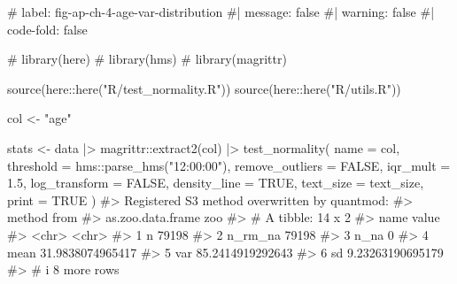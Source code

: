 \documentclass[
  12pt,
  a4paper,
  oneside]{tesesusp}
\newenvironment{Shaded}{\begin{snugshade}}{\end{snugshade}}
\newcommand{\AttributeTok}[1]{\textcolor[rgb]{0.40,0.45,0.13}{#1}}
\newcommand{\CommentTok}[1]{\textcolor[rgb]{0.37,0.37,0.37}{#1}}
\newcommand{\ConstantTok}[1]{\textcolor[rgb]{0.56,0.35,0.01}{#1}}
\newcommand{\FloatTok}[1]{\textcolor[rgb]{0.68,0.00,0.00}{#1}}
\newcommand{\FunctionTok}[1]{\textcolor[rgb]{0.28,0.35,0.67}{#1}}
\newcommand{\NormalTok}[1]{\textcolor[rgb]{0.00,0.23,0.31}{#1}}
\newcommand{\OtherTok}[1]{\textcolor[rgb]{0.00,0.23,0.31}{#1}}
\newcommand{\SpecialCharTok}[1]{\textcolor[rgb]{0.37,0.37,0.37}{#1}}
\newcommand{\StringTok}[1]{\textcolor[rgb]{0.13,0.47,0.30}{#1}}
\begin{document}
\begin{Shaded}
\begin{Highlighting}[numbers=left,,]
\CommentTok{\# label: fig{-}ap{-}ch{-}4{-}age{-}var{-}distribution}
\CommentTok{\#| message: false}
\CommentTok{\#| warning: false}
\CommentTok{\#| code{-}fold: false}

\CommentTok{\# library(here)}
\CommentTok{\# library(hms)}
\CommentTok{\# library(magrittr)}

\FunctionTok{source}\NormalTok{(here}\SpecialCharTok{::}\FunctionTok{here}\NormalTok{(}\StringTok{"R/test\_normality.R"}\NormalTok{))}
\FunctionTok{source}\NormalTok{(here}\SpecialCharTok{::}\FunctionTok{here}\NormalTok{(}\StringTok{"R/utils.R"}\NormalTok{))}

\NormalTok{col }\OtherTok{\textless{}{-}} \StringTok{"age"}

\NormalTok{stats }\OtherTok{\textless{}{-}}\NormalTok{ data }\SpecialCharTok{|\textgreater{}} 
\NormalTok{  magrittr}\SpecialCharTok{::}\FunctionTok{extract2}\NormalTok{(col) }\SpecialCharTok{|\textgreater{}} 
  \FunctionTok{test\_normality}\NormalTok{(}
    \AttributeTok{name =}\NormalTok{ col, }
    \AttributeTok{threshold =}\NormalTok{ hms}\SpecialCharTok{::}\FunctionTok{parse\_hms}\NormalTok{(}\StringTok{"12:00:00"}\NormalTok{), }
    \AttributeTok{remove\_outliers =} \ConstantTok{FALSE}\NormalTok{, }
    \AttributeTok{iqr\_mult =} \FloatTok{1.5}\NormalTok{, }
    \AttributeTok{log\_transform =} \ConstantTok{FALSE}\NormalTok{,}
    \AttributeTok{density\_line =} \ConstantTok{TRUE}\NormalTok{, }
    \AttributeTok{text\_size =}\NormalTok{ text\_size,}
    \AttributeTok{print =} \ConstantTok{TRUE}
\NormalTok{  )}
\CommentTok{\#\textgreater{} Registered S3 method overwritten by \textquotesingle{}quantmod\textquotesingle{}:}
\CommentTok{\#\textgreater{}   method            from}
\CommentTok{\#\textgreater{}   as.zoo.data.frame zoo}
\CommentTok{\#\textgreater{} \# A tibble: 14 x 2}
\CommentTok{\#\textgreater{}   name    value           }
\CommentTok{\#\textgreater{}   \textless{}chr\textgreater{}   \textless{}chr\textgreater{}           }
\CommentTok{\#\textgreater{} 1 n       79198           }
\CommentTok{\#\textgreater{} 2 n\_rm\_na 79198           }
\CommentTok{\#\textgreater{} 3 n\_na    0               }
\CommentTok{\#\textgreater{} 4 mean    31.9838074965417}
\CommentTok{\#\textgreater{} 5 var     85.2414919292643}
\CommentTok{\#\textgreater{} 6 sd      9.23263190695179}
\CommentTok{\#\textgreater{} \# i 8 more rows}
\end{Highlighting}
\end{Shaded}
\end{document}
